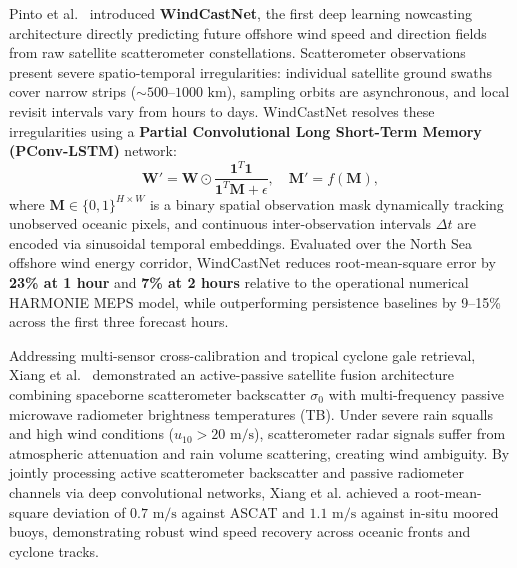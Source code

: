 Pinto et al.~\cite{pinto2026windcastnet} introduced \textbf{WindCastNet}, the first deep learning nowcasting architecture directly predicting future offshore wind speed and direction fields from raw satellite scatterometer constellations. Scatterometer observations present severe spatio-temporal irregularities: individual satellite ground swaths cover narrow strips ($\sim 500\text{--}1000\text{ km}$), sampling orbits are asynchronous, and local revisit intervals vary from hours to days. WindCastNet resolves these irregularities using a \textbf{Partial Convolutional Long Short-Term Memory (PConv-LSTM)} network:
\begin{equation}
    \mathbf{W}' = \mathbf{W} \odot \frac{\mathbf{1}^T \mathbf{1}}{\mathbf{1}^T \mathbf{M} + \epsilon}, \quad \mathbf{M}' = f(\mathbf{M}),
    \label{eq:pconv_masking}
\end{equation}
where $\mathbf{M} \in \{0, 1\}^{H \times W}$ is a binary spatial observation mask dynamically tracking unobserved oceanic pixels, and continuous inter-observation intervals $\Delta t$ are encoded via sinusoidal temporal embeddings. Evaluated over the North Sea offshore wind energy corridor, WindCastNet reduces root-mean-square error by \textbf{23\% at 1 hour} and \textbf{7\% at 2 hours} relative to the operational numerical HARMONIE MEPS model, while outperforming persistence baselines by 9--15\% across the first three forecast hours.

Addressing multi-sensor cross-calibration and tropical cyclone gale retrieval, Xiang et al.~\cite{xiang2024scatterometer} demonstrated an active-passive satellite fusion architecture combining spaceborne scatterometer backscatter $\sigma_0$ with multi-frequency passive microwave radiometer brightness temperatures (TB). Under severe rain squalls and high wind conditions ($u_{10} > 20\text{ m/s}$), scatterometer radar signals suffer from atmospheric attenuation and rain volume scattering, creating wind ambiguity. By jointly processing active scatterometer backscatter and passive radiometer channels via deep convolutional networks, Xiang et al. achieved a root-mean-square deviation of \textbf{$0.7\text{ m/s}$} against ASCAT and \textbf{$1.1\text{ m/s}$} against in-situ moored buoys, demonstrating robust wind speed recovery across oceanic fronts and cyclone tracks.

